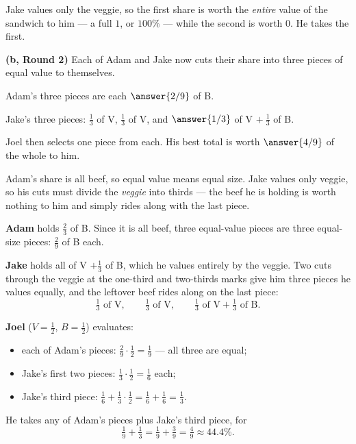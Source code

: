 \documentclass[12pt]{ximera}
\begin{document}
\begin{problem}
\begin{prompt}
\begin{feedback}
Jake values only the veggie, so the first share is worth the \emph{entire} value of the
sandwich to him --- a full $1$, or $100\%$ --- while the second is worth $0$. He takes
the first.
\end{feedback}
\end{prompt}

\begin{prompt}
\textbf{(b, Round 2)} Each of Adam and Jake now cuts their share into three pieces of
equal value to themselves.

Adam's three pieces are each $\answer{2/9}$ of B.

\smallskip
Jake's three pieces: $\frac13$ of V, \quad $\frac13$ of V, \quad and
$\answer{1/3}$ of V $+\ \frac13$ of B.

\smallskip
Joel then selects one piece from each. His best total is worth $\answer{4/9}$ of the
whole to him.

\begin{hint}
Adam's share is all beef, so equal value means equal size. Jake values only veggie, so
his cuts must divide the \emph{veggie} into thirds --- the beef he is holding is worth
nothing to him and simply rides along with the last piece.
\end{hint}

\begin{feedback}
\textbf{Adam} holds $\frac23$ of B. Since it is all beef, three equal-value pieces are
three equal-size pieces: $\frac29$ of B each.

\textbf{Jake} holds all of V $+\frac13$ of B, which he values entirely by the veggie. Two
cuts through the veggie at the one-third and two-thirds marks give him three pieces he
values equally, and the leftover beef rides along on the last piece:
\[ \tfrac13 \text{ of V}, \qquad \tfrac13 \text{ of V}, \qquad \tfrac13 \text{ of V} + \tfrac13 \text{ of B}. \]

\textbf{Joel} ($V=\frac12$, $B=\frac12$) evaluates:
\begin{itemize}
\item each of Adam's pieces: $\frac29 \cdot \frac12 = \frac19$ --- all three are equal;
\item Jake's first two pieces: $\frac13\cdot\frac12 = \frac16$ each;
\item Jake's third piece: $\frac16 + \frac13\cdot\frac12 = \frac16+\frac16 = \frac13$.
\end{itemize}
He takes any of Adam's pieces plus Jake's third piece, for
\[ \tfrac19 + \tfrac13 = \tfrac19+\tfrac39 = \tfrac49 \approx 44.4\%. \]


\end{feedback}
\end{prompt}
\end{problem}
\end{document}
